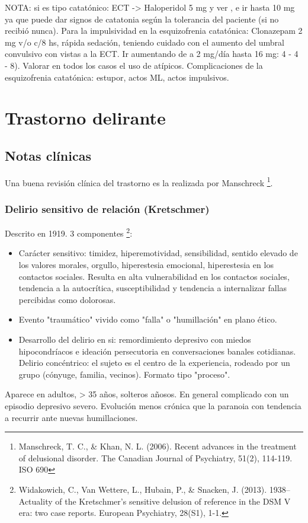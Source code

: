 \documentclass{scrbook}
\begin{document}
NOTA: si es tipo catatónico: ECT -> Haloperidol 5 mg y ver , e ir hasta 10 mg ya que puede dar signos de catatonia según la tolerancia del paciente (si no recibió nunca). Para la impulsividad en la esquizofrenia catatónica: Clonazepam 2 mg v/o c/8 hs, rápida sedación, teniendo cuidado con el aumento del umbral convulsivo con vistas a la ECT. Ir aumentando de a 2 mg/día hasta 16 mg: 4 - 4 - 8). Valorar en todos los casos el uso de atípicos. Complicaciones de la esquizofrenia catatónica: estupor, actos ML, actos impulsivos.
\printbibliography
\chapter{Trastorno delirante}
\section*{Notas clínicas}
Una buena revisión clínica del trastorno es la realizada por Manschreck \footnote{Manschreck, T. C., \& Khan, N. L. (2006). Recent advances in the treatment of delusional disorder. The Canadian Journal of Psychiatry, 51(2), 114-119. ISO 690}.
\subsection*{Delirio sensitivo de relación (Kretschmer)}
Descrito en 1919. 3 componentes \footnote{Widakowich, C., Van Wettere, L., Hubain, P., \& Snacken, J. (2013). 1938–Actuality of the Kretschmer's sensitive delusion of reference in the DSM V era: two case reports. European Psychiatry, 28(S1), 1-1.}:
\begin{itemize}
	\item Carácter sensitivo: timidez, hiperemotividad, sensibilidad, sentido elevado de los valores morales, orgullo, hiperestesia emocional, hiperestesia en los contactos sociales. Resulta en alta vulnerabilidad en los contactos sociales, tendencia a la autocrítica, susceptibilidad y tendencia a internalizar fallas percibidas como dolorosas.
	\item Evento "traumático" vivido como "falla" o "humillación" en plano ético.
	\item  Desarrollo del delirio en si: remordimiento depresivo con miedos hipocondríacos e ideación persecutoria en conversaciones banales cotidianas. Delirio concéntrico: el sujeto es el centro de la experiencia, rodeado por un grupo (cónyuge, familia, vecinos). Formato tipo "proceso".
\end{itemize}
Aparece en adultos, > 35 años, solteros añosos. En general complicado con un episodio depresivo severo. Evolución menos crónica que la paranoia con tendencia a recurrir ante nuevas humillaciones.
\end{document}
